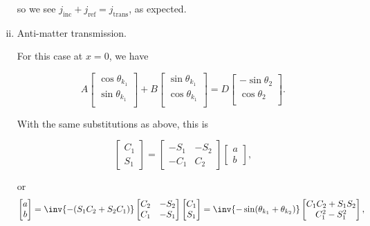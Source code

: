 \begin{enumerate}[(i)]
so we see \( j_{\textrm{inc}} + j_{\textrm{ref}} = j_{\textrm{trans}} \), as expected.

\item Anti-matter transmission.

For this case at \( x = 0 \), we have

\begin{dmath}\label{eqn:gradQuantumProblemSet4Problem3:940}
A
\begin{bmatrix}
\cos\theta_{k_1} \\
\sin\theta_{k_1} \\
\end{bmatrix}
+
B
\begin{bmatrix}
\sin\theta_{k_1} \\
\cos\theta_{k_1} \\
\end{bmatrix}
=
D
\begin{bmatrix}
-\sin \theta_2 \\
\cos \theta_2 \\
\end{bmatrix}.
\end{dmath}

With the same substitutions as above, this is

\begin{dmath}\label{eqn:gradQuantumProblemSet4Problem3:860}
\begin{bmatrix}
C_1 \\
S_1
\end{bmatrix}
=
\begin{bmatrix}
- S_1 & -S_2 \\
- C_1 & C_2
\end{bmatrix}
\begin{bmatrix}
a \\
b
\end{bmatrix},
\end{dmath}

or
\begin{dmath}\label{eqn:gradQuantumProblemSet4Problem3:880}
\begin{bmatrix}
a \\
b
\end{bmatrix}
=
\inv{- (S_1 C_2 + S_2 C_1) }
\begin{bmatrix}
C_2 & -S_2 \\
C_1 & -S_1
\end{bmatrix}
\begin{bmatrix}
C_1 \\
S_1
\end{bmatrix}
=
\inv{-\sin(\theta_{k_1} + \theta_{k_2})}
\begin{bmatrix}
C_1 C_2 + S_1 S_2 \\
C_1^2 - S_1^2
\end{bmatrix},
\end{dmath}


\end{enumerate}
